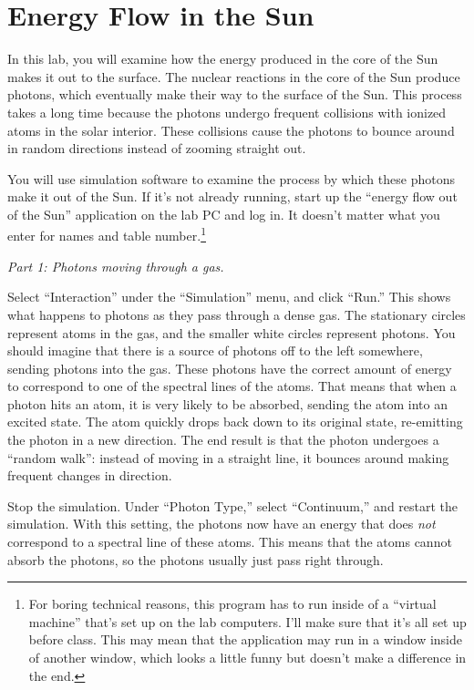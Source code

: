 \section{Energy Flow in the Sun}

\makelabheader

In this lab, you will examine how the energy produced in the core
of the Sun makes it out to the surface.  The nuclear reactions in
the core of the Sun produce photons, which eventually make their way
to the surface of the Sun.  This process takes a long time because
the photons undergo frequent collisions with ionized atoms
in the solar interior.  These collisions cause the photons to
bounce around in random directions instead of zooming
straight out.

You will use simulation software to examine the process by which
these photons make it out of the Sun.
If it's not already running, 
start up the ``energy flow out of the Sun'' application on the lab
PC and log
in.  It doesn't matter what you enter for names and table number.\footnote{For 
boring technical reasons, this program has to run inside of a 
``virtual machine'' that's set up on the lab computers. I'll make sure
that it's all set up before class. This may mean that the application
may run in a window inside of another window, which looks a little funny
but doesn't make a difference in the end. }

\medskip

{\it Part 1: Photons moving through a gas.}

Select ``Interaction'' under the ``Simulation'' menu, and click
``Run.''  This shows what happens to photons as they pass through a
dense gas.  The stationary circles represent atoms in the gas, and the
smaller white circles represent photons.  You should imagine that
there is a source of photons off to the left somewhere, sending
photons into the gas.  These photons have the correct amount of energy
to correspond to one of the spectral lines of the atoms.  That means
that when a photon hits an atom, it is very likely to be absorbed,
sending the atom into an excited state.  The atom quickly drops
back down to its original state, re-emitting the photon in a new direction.
The end result is that the photon undergoes a ``random walk'': instead
of moving in a straight line, it bounces around making frequent
changes in direction.

Stop the simulation.  Under ``Photon Type,'' select ``Continuum,'' and
restart the simulation.  With this setting, the photons now have an
energy that does {\it not} correspond to a spectral line of these
atoms.  This means that the atoms cannot absorb the photons, so the
photons usually just pass right through.  

